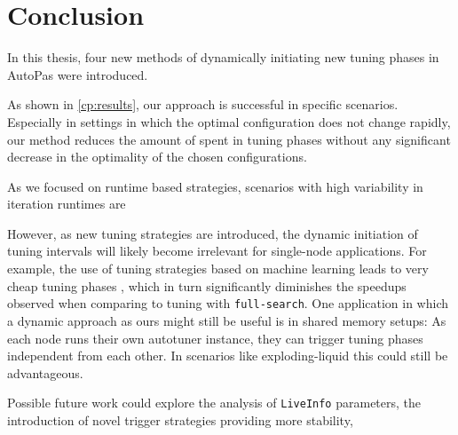 \chapter[Conclusion]{Conclusion}
\label{cp:conclusion}

%

In this thesis, four new methods of dynamically initiating new tuning phases in AutoPas were introduced. \textellipsis

As shown in \autoref{cp:results}, our approach is successful in specific scenarios.
Especially in settings in which the optimal configuration does not change rapidly, our method reduces the amount of spent in tuning phases without any significant decrease in the optimality of the chosen configurations. %

As we focused on runtime based strategies, scenarios with high variability in iteration runtimes are \textellipsis

However, as new tuning strategies are introduced, the dynamic initiation of tuning intervals will likely become irrelevant for single-node applications. For example, the use of tuning strategies based on machine learning leads to very cheap tuning phases \cite{Newcome2025}, which in turn significantly diminishes the speedups observed when comparing to tuning with \texttt{full-search}. One application in which a dynamic approach as ours might still be useful is in shared memory setups: As each node runs their own autotuner instance, they can trigger tuning phases independent from each other. In scenarios like exploding-liquid this could still be advantageous.

Possible future work could explore the analysis of \texttt{LiveInfo} parameters, the introduction of novel trigger strategies providing more stability, \textellipsis
